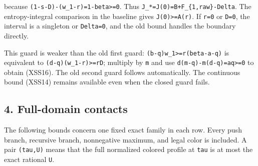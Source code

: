 because \texttt{(1-s-D)-(w\_1-r)=1-beta\textgreater{}=0}. Thus \texttt{J\_*=J(0)=B+F\_\{1,raw\}-Delta}. The entropy-integral comparison in the baseline gives \texttt{J(0)\textgreater{}=A(r)}. If \texttt{r=0} or \texttt{D=0}, the interval is a singleton or \texttt{Delta=0}, and the old bound handles the boundary directly.

This guard is weaker than the old first guard: \texttt{(b-q)w\_1\textgreater{}=r(beta-a-q)} is equivalent to \texttt{(d-q)(w\_1-r)\textgreater{}=rD}; multiply by \texttt{m} and use \texttt{d(m-q)-m(d-q)=aq\textgreater{}=0} to obtain (XSS16). The old second guard follows automatically. The continuous bound (XSS14) remains available even when the closed guard fails.

\hypertarget{af-a9ec399514-full-domain-contacts}{%
\subsection{4. Full-domain contacts}\label{af-a9ec399514-full-domain-contacts}}

The following bounds concern one fixed exact family in each row. Every push branch, recursive branch, nonnegative maximum, and legal color is included. A pair \texttt{(tau,U)} means that the full normalized colored profile at \texttt{tau} is at most the exact rational \texttt{U}.

